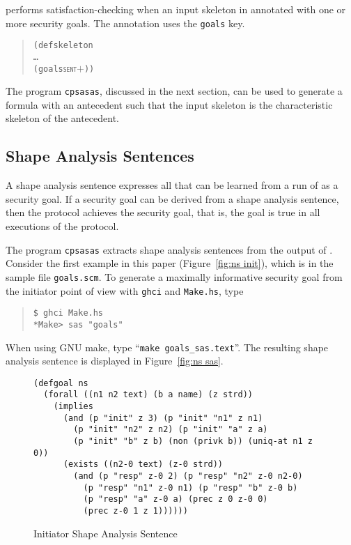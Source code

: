 {\cpsa} performs satisfaction-checking when an input skeleton in annotated
with one or more security goals.  The annotation uses the
\texttt{goals} key.

\begin{quote}
  \begin{alltt}
(defskeleton
   \ldots
   (goals \textsc{sent\ensuremath{+}}))
  \end{alltt}
\end{quote}

The program \texttt{cpsasas}, discussed in the next section, can be
used to generate a formula with an antecedent such that the input
skeleton is the characteristic skeleton of the antecedent.

\subsection{Shape Analysis Sentences}\label{sec:sas}

A shape analysis sentence expresses all that can be learned from a run
of {\cpsa} as a security goal.  If a security goal can be derived from
a shape analysis sentence, then the protocol achieves the security
goal, that is, the goal is true in all executions of the protocol.

The program \texttt{cpsasas} extracts shape analysis sentences from
the output of {\cpsa}.  Consider the first example in this paper
(Figure~\ref{fig:ns init}), which is in the sample file
\texttt{goals.scm}.  To generate a maximally informative security goal
from the initiator point of view with \texttt{ghci} and
\texttt{Make.hs}, type
\begin{quote}
\begin{verbatim}
$ ghci Make.hs
*Make> sas "goals"
\end{verbatim}
\end{quote}
When using GNU make, type ``\texttt{make goals\_sas.text}''.  The
resulting shape analysis sentence is displayed in Figure~\ref{fig:ns
  sas}.

\begin{figure}\small
\begin{verbatim}
(defgoal ns
  (forall ((n1 n2 text) (b a name) (z strd))
    (implies
      (and (p "init" z 3) (p "init" "n1" z n1)
        (p "init" "n2" z n2) (p "init" "a" z a)
        (p "init" "b" z b) (non (privk b)) (uniq-at n1 z 0))
      (exists ((n2-0 text) (z-0 strd))
        (and (p "resp" z-0 2) (p "resp" "n2" z-0 n2-0)
          (p "resp" "n1" z-0 n1) (p "resp" "b" z-0 b)
          (p "resp" "a" z-0 a) (prec z 0 z-0 0)
          (prec z-0 1 z 1))))))
\end{verbatim}
\caption{Initiator Shape Analysis Sentence}\label{fig:ns sas}
\end{figure}

